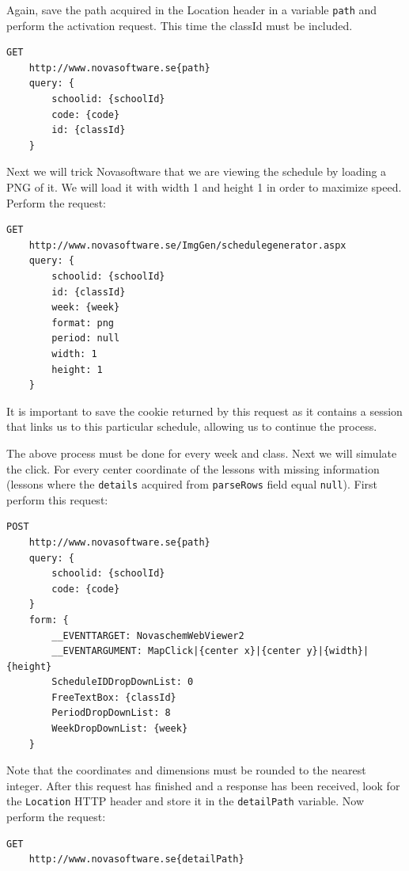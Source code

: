 \documentclass{article}
\begin{document}
	Again, save the path acquired in the Location header in a variable \texttt{path} and perform the activation request. This time the classId must be included.
	
	\begin{lstlisting}[language=HTTP, style=nonumbers]
	GET
	http://www.novasoftware.se{path}
	query: {
		schoolid: {schoolId}
		code: {code}
		id: {classId}
	}
	\end{lstlisting}
	
	Next we will trick Novasoftware that we are viewing the schedule by loading a PNG of it. We will load it with width 1 and height 1 in order to maximize speed. Perform the request:
	
	\newpage
	\begin{lstlisting}[language=HTTP, style=nonumbers]
	GET
	http://www.novasoftware.se/ImgGen/schedulegenerator.aspx
	query: {
		schoolid: {schoolId}
		id: {classId}
		week: {week}
		format: png
		period: null
		width: 1
		height: 1
	}
	\end{lstlisting}
	
	It is important to save the cookie returned by this request as it contains a session that links us to this particular schedule, allowing us to continue the process.
	
	The above process must be done for every week and class. Next we will simulate the click. For every center coordinate of the lessons with missing information (lessons where the \texttt{details} acquired from \texttt{parseRows} field equal \texttt{null}). First perform this request:
	
	\begin{lstlisting}[language=HTTP, style=nonumbers]
	POST
	http://www.novasoftware.se{path}
	query: {
		schoolid: {schoolId}
		code: {code}
	}
	form: {
		__EVENTTARGET: NovaschemWebViewer2
		__EVENTARGUMENT: MapClick|{center x}|{center y}|{width}|{height}
		ScheduleIDDropDownList: 0
		FreeTextBox: {classId}
		PeriodDropDownList: 8
		WeekDropDownList: {week}
	}
	\end{lstlisting}
	
	Note that the coordinates and dimensions must be rounded to the nearest integer. After this request has finished and a response has been received, look for the \texttt{Location} HTTP header and store it in the \texttt{detailPath} variable. Now perform the request:
	
	\begin{lstlisting}[language=HTTP, style=nonumbers]
	GET
	http://www.novasoftware.se{detailPath}
	\end{lstlisting}
	
\end{document}
